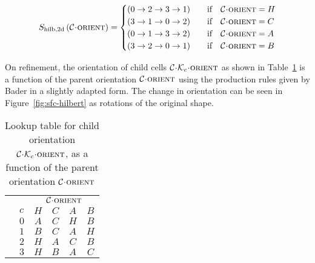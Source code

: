 \documentclass[twoside]{IIBproject}
\newcommand{\acc}{{\mkern 0.5mu\cdot\mkern 0.5mu}}
\numberwithin{figure}{section}
\begin{document}
            \begin{equation}
                S_{\mathrm{hilb,2d}}\left(\mathcal{C}\acc\textproc{orient}\right) =
                \begin{cases}
                    \left( 0 \to 2 \to 3 \to 1\right) & \qif \mathcal{C}\acc\textproc{orient}=H \\
                    \left( 3 \to 1 \to 0 \to 2\right) & \qif \mathcal{C}\acc\textproc{orient}=C \\
                    \left( 0 \to 1 \to 3 \to 2\right) & \qif \mathcal{C}\acc\textproc{orient}=A \\
                    \left( 3 \to 2 \to 0 \to 1\right) & \qif \mathcal{C}\acc\textproc{orient}=B
                \end{cases}
            \end{equation}

            On refinement, the orientation of child cells $\mathcal{C}\acc\mathcal{K}_c\acc\textproc{orient}$ as shown in Table~\ref{tab:hilb-Dc} is a function of the parent orientation $\mathcal{C}\acc\textproc{orient}$ using the production rules given by Bader \cite{bader2013} in a slightly adapted form. The change in orientation can be seen in Figure~\ref{fig:sfc-hilbert} as rotations of the original shape. 

            \begin{table}[H]
                \centering
                \captionsetup{width=0.8\textwidth}
                \caption{Lookup table for child orientation $\mathcal{C}\acc\mathcal{K}_c\acc\textproc{orient}$, as a function of the parent orientation $\mathcal{C}\acc\textproc{orient}$}
                \label{tab:hilb-Dc}
                \begin{tabularx}{5cm}{l>{\raggedright}X*{4}{c}}
                    \toprule
                    &   & \multicolumn{4}{c}{$\mathcal{C}\acc\textproc{orient}$} \\ \cmidrule{3-6}
                    & $c$   & $H$    & $C$    & $A$    & $B$    \\ \midrule
                    & $0$   & $A$    & $C$    & $H$    & $B$    \\
                    & $1$   & $B$    & $C$    & $A$    & $H$    \\
                    & $2$   & $H$    & $A$    & $C$    & $B$    \\
                    & $3$   & $H$    & $B$    & $A$    & $C$    \\ \bottomrule
                \end{tabularx}
            \end{table}
\end{document}
